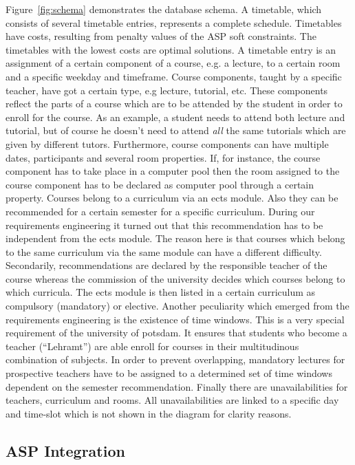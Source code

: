 \documentclass[12pt]{article} %
\begin{document}
Figure~\ref{fig:schema} demonstrates the database schema.
A timetable, which consists of several timetable entries, represents a complete schedule.
Timetables have costs, resulting from penalty values of the ASP soft constraints.
The timetables with the lowest costs are optimal solutions.
A timetable entry is an assignment of a certain component of a course, e.g. a lecture, to a certain room and a specific weekday and timeframe.
Course components, taught by a specific teacher, have got a certain type, e.g lecture, tutorial, etc.
These components reflect the parts of a course which are to be attended by the student in order to enroll for the course.
As an example, a student needs to attend both lecture and tutorial, but of course he doesn't need to attend \emph{all} the same tutorials which are given by different tutors.
Furthermore, course components can have multiple dates, participants and several room properties.
If, for instance, the course component has to take place in a computer pool then the room assigned to the course component has to be declared as computer pool through a certain property.
Courses belong to a curriculum via an ects module.
Also they can be recommended for a certain semester for a specific curriculum.
During our requirements engineering it turned out that this recommendation has to be independent from the ects module.
The reason here is that courses which belong to the same curriculum via the same module can have a different difficulty.
Secondarily, recommendations are declared by the responsible teacher of the course whereas the commission of the university decides which courses belong to which curricula.
The ects module is then listed in a certain curriculum as compulsory (mandatory) or elective.
Another peculiarity which emerged from the requirements engineering is the existence of time windows.
This is a very special requirement of the university of potsdam.
It ensures that students who become a teacher (``Lehramt'') are able enroll for courses in their multitudinous combination of subjects.
In order to prevent overlapping, mandatory lectures for prospective teachers have to be assigned to a determined set of time windows dependent on the semester recommendation.
Finally there are unavailabilities for teachers, curriculum and rooms.
All unavailabilities are linked to a specific day and time-slot which is not shown in the diagram for clarity reasons.

\subsection{ASP Integration} 
\end{document}
